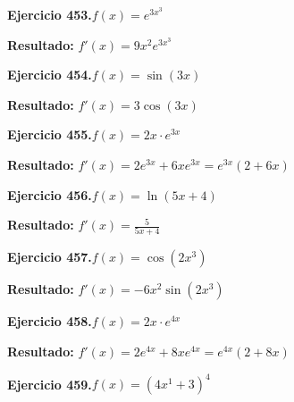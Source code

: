 \documentclass[10pt,a4paper]{article}
\begin{document}
\begin{ejbox}
\textbf{Ejercicio 453.}\quad $f(x) = e^{3x^{3}}$
\end{ejbox}

\begin{solbox}
\textbf{Resultado:} \(\displaystyle f'(x) = 9x^{2}e^{3x^{3}}\)
\end{solbox}

\newpage
\begin{ejbox}
\textbf{Ejercicio 454.}\quad $f(x) = \sin(3x)$
\end{ejbox}

\begin{solbox}
\textbf{Resultado:} \(\displaystyle f'(x) = 3\cos(3x)\)
\end{solbox}

\begin{ejbox}
\textbf{Ejercicio 455.}\quad $f(x) = 2x \cdot e^{3x}$
\end{ejbox}

\begin{solbox}
\textbf{Resultado:} \(\displaystyle f'(x) = 2e^{3x} + 6xe^{3x} = e^{3x}(2 + 6x)\)
\end{solbox}

\begin{ejbox}
\textbf{Ejercicio 456.}\quad $f(x) = \ln(5x + 4)$
\end{ejbox}

\begin{solbox}
\textbf{Resultado:} \(\displaystyle f'(x) = \frac{5}{5x + 4}\)
\end{solbox}

\newpage
\begin{ejbox}
\textbf{Ejercicio 457.}\quad $f(x) = \cos(2x^{3})$
\end{ejbox}

\begin{solbox}
\textbf{Resultado:} \(\displaystyle f'(x) = -6x^{2}\sin(2x^{3})\)
\end{solbox}

\begin{ejbox}
\textbf{Ejercicio 458.}\quad $f(x) = 2x \cdot e^{4x}$
\end{ejbox}

\begin{solbox}
\textbf{Resultado:} \(\displaystyle f'(x) = 2e^{4x} + 8xe^{4x} = e^{4x}(2 + 8x)\)
\end{solbox}

\begin{ejbox}
\textbf{Ejercicio 459.}\quad $f(x) = (4x^{1} +3)^{4}$
\end{ejbox}
\end{document}
